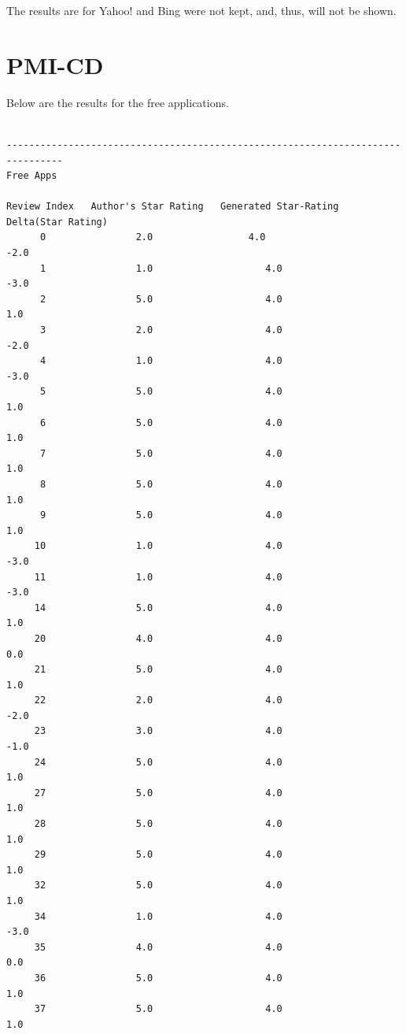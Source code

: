 \documentclass[11pt]{report} %
\begin{document}
The results are for Yahoo! and Bing were not kept, and, thus, will not be shown.

	\section{PMI-CD}

Below are the results for the free applications.

\begin{verbatim}

--------------------------------------------------------------------------------
Free Apps

Review Index   Author's Star Rating   Generated Star-Rating   Delta(Star Rating)
      0                2.0 	               4.0                      -2.0
      1                1.0                    4.0                   -3.0
      2                5.0                    4.0                    1.0
      3                2.0                    4.0                   -2.0
      4                1.0                    4.0                   -3.0
      5                5.0                    4.0                    1.0
      6                5.0                    4.0                    1.0
      7                5.0                    4.0                    1.0
      8                5.0                    4.0                    1.0
      9                5.0                    4.0                    1.0
     10                1.0                    4.0                   -3.0
     11                1.0                    4.0                   -3.0 
     14                5.0                    4.0                    1.0
     20                4.0                    4.0                    0.0
     21                5.0                    4.0                    1.0
     22                2.0                    4.0                   -2.0
     23                3.0                    4.0                   -1.0
     24                5.0                    4.0                    1.0
     27                5.0                    4.0                    1.0
     28                5.0                    4.0                    1.0
     29                5.0                    4.0                    1.0
     32                5.0                    4.0                    1.0
     34                1.0                    4.0                   -3.0
     35                4.0                    4.0                    0.0
     36                5.0                    4.0                    1.0
     37                5.0                    4.0                    1.0

\end{verbatim}
\end{document}
